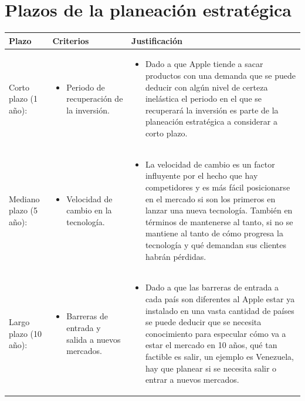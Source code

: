 \documentclass{article}
\begin{document}
\section{Plazos de la planeación estratégica}
\begin{center}
    \begin{tabular}{ |p{4cm}|p{4cm}|p{8cm}| }
        \hline
            Plazo & Criterios & Justificación \\
        \hline 
            Corto plazo (1 año): 
            & 
            \begin{itemize}
                \item Periodo de recuperación de la inversión.
            \end{itemize}
            & 
            \begin{itemize}
                \item Dado a que Apple tiende a sacar productos con una demanda que se puede deducir con algún nivel de certeza inelástica el periodo en el que se recuperará la inversión es parte de la planeación estratégica a considerar a corto plazo.
            \end{itemize}
            \\ 
        \hline
            Mediano plazo (5 año): 
            & 
            \begin{itemize}
                \item Velocidad de cambio en la tecnología.
            \end{itemize}
            & 
            \begin{itemize}
                \item La velocidad de cambio es un factor influyente por el hecho que hay competidores y es más fácil posicionarse en el mercado si son los primeros en lanzar una nueva tecnología. También en términos de mantenerse al tanto, si no se mantiene al tanto de cómo progresa la tecnología y qué demandan sus clientes habrán pérdidas.
            \end{itemize}
            \\ 
        \hline
            Largo plazo (10 año): 
            & 
            \begin{itemize}
                \item Barreras de entrada y salida a nuevos mercados.
            \end{itemize}
            & 
            \begin{itemize}
                \item Dado a que las barreras de entrada a cada país son diferentes al Apple estar ya instalado en una vasta cantidad de países se puede deducir que se necesita conocimiento para especular cómo va a estar el mercado en 10 años, qué tan factible es salir, un ejemplo es Venezuela, hay que planear si se necesita salir o entrar a nuevos mercados.
            \end{itemize}
            \\ 
        \hline
    \end{tabular}
\end{center}
\end{document}
